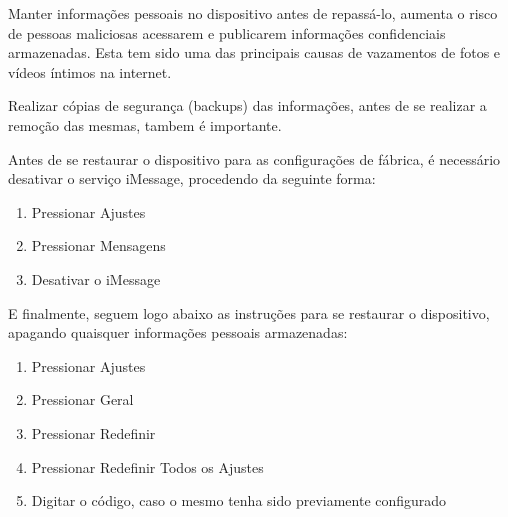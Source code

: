 Manter informa\c c\~oes pessoais no dispositivo antes de repass\'a-lo, aumenta o risco de pessoas maliciosas acessarem e publicarem informa\c c\~oes confidenciais armazenadas. Esta tem sido uma das principais causas de vazamentos de fotos e v\'ideos \'intimos na internet. 

Realizar c\'opias de seguran\c ca (backups) das informa\c c\~oes, antes de se realizar a remo\c c\~ao das mesmas, tambem \'e importante.

Antes de se restaurar o dispositivo para as configura\c c\~oes de f\'abrica, \'e necess\'ario desativar o servi\c co iMessage, procedendo da seguinte forma:

\begin{enumerate}
\item Pressionar Ajustes
\item Pressionar Mensagens
\item Desativar o iMessage
\end{enumerate}

E finalmente, seguem logo abaixo as instru\c c\~oes para se restaurar o dispositivo, apagando quaisquer informa\c c\~oes pessoais armazenadas:

\begin{enumerate}
\item Pressionar Ajustes
\item Pressionar Geral
\item Pressionar Redefinir
\item Pressionar Redefinir Todos os Ajustes
\item Digitar o c\'odigo, caso o mesmo tenha sido previamente configurado
\end{enumerate}

